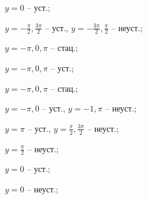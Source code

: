 \begin{enumsols}
		\label{sol:stability_zeros:geometrical_part2}
		\item \( y = 0 \) -- уст.; %
		\item \( y = -\frac{\pi}{2}, \frac{3\pi}{2} \) -- уст., \( y = -\frac{3\pi}{2}, \frac{\pi}{2} \) -- неуст.; %
		\item \( y = -\pi, 0, \pi \) -- стац.; %
		\item \( y = -\pi, 0, \pi \) -- уст.;  %
		\item \( y = -\pi, 0, \pi \) -- стац.; %
		\item \( y = -\pi, 0 \) -- уст., \( y = -1, \pi \) -- неуст.; %
		\item \( y = \pi \) -- уст., \( y = \frac{\pi}{2}, \frac{3\pi}{2} \) -- неуст.; %
		\item \( y = \frac{\pi}{2} \) -- неуст.; %
		\item \( y = 0 \) -- уст.; %
		\item \( y = 0 \) -- неуст.; %


\end{enumsols}
